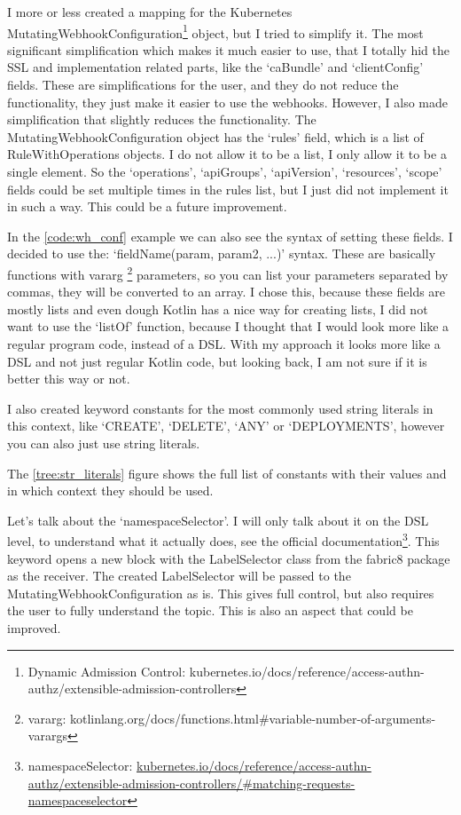 I more or less created a mapping for the Kubernetes MutatingWebhookConfiguration\footnote{Dynamic Admission Control: kubernetes.io/docs/reference/access-authn-authz/extensible-admission-controllers} object, but I tried to simplify it. The most significant simplification which makes it much easier to use, that I totally hid the SSL and implementation related parts, like the `caBundle' and `clientConfig' fields. These are simplifications for the user, and they do not reduce the functionality, they just make it easier to use the webhooks. However, I also made simplification that slightly reduces the functionality. The MutatingWebhookConfiguration object has the `rules' field, which is a list of RuleWithOperations objects. I do not allow it to be a list, I only allow it to be a single element. So the `operations', `apiGroups', `apiVersion', `resources', `scope' fields could be set multiple times in the rules list, but I just did not implement it in such a way. This could be a future improvement.

In the \ref{code:wh_conf} example we can also see the syntax of setting these fields. I decided to use the: `fieldName(param, param2, ...)' syntax. These are basically functions with vararg \footnote{vararg: kotlinlang.org/docs/functions.html\#variable-number-of-arguments-varargs} parameters, so you can list your parameters separated by commas, they will be converted to an array. I chose this, because these fields are mostly lists and even dough Kotlin has a nice way for creating lists, I did not want to use the `listOf' function, because I thought that I would look more like a regular program code, instead of a DSL. With my approach it looks more like a DSL and not just regular Kotlin code, but looking back, I am not sure if it is better this way or not.

I also created keyword constants for the most commonly used string literals in this context, like `CREATE', `DELETE', `ANY' or `DEPLOYMENTS', however you can also just use string literals.

The \ref{tree:str_literals} figure shows the full list of constants with their values and in which context they should be used.



Let's talk about the `namespaceSelector'. I will only talk about it on the DSL level, to understand what it actually does, see the official documentation\footnote{namespaceSelector: \url{kubernetes.io/docs/reference/access-authn-authz/extensible-admission-controllers/\#matching-requests-namespaceselector}}. 
This keyword opens a new block with the LabelSelector class from the fabric8 package as the receiver. The created LabelSelector will be passed to the MutatingWebhookConfiguration as is. This gives full control, but also requires the user to fully understand the topic. This is also an aspect that could be improved.

